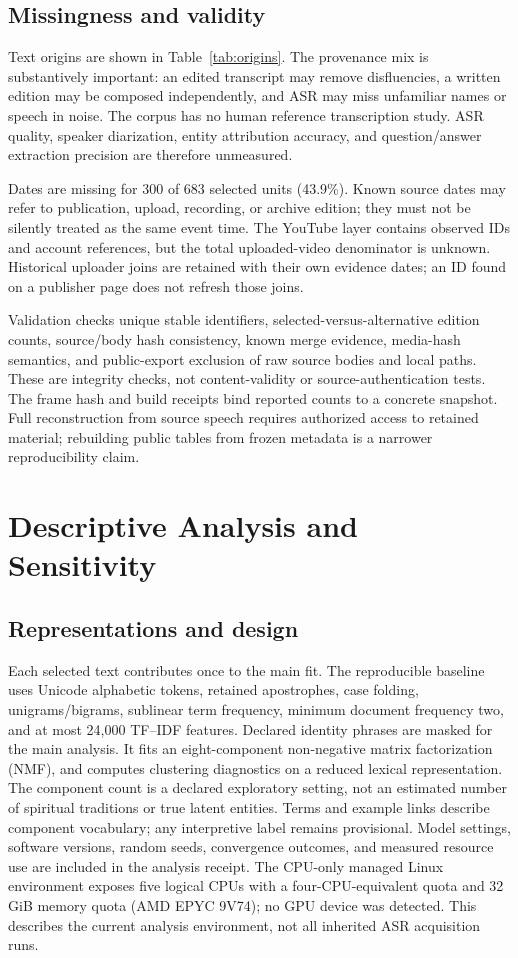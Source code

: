 

\subsection{Missingness and validity}
Text origins are shown in Table~\ref{tab:origins}. The provenance mix is substantively important: an edited transcript may remove disfluencies, a written edition may be composed independently, and ASR may miss unfamiliar names or speech in noise. The corpus has no human reference transcription study. ASR quality, speaker diarization, entity attribution accuracy, and question/answer extraction precision are therefore unmeasured.

Dates are missing for 300 of 683 selected units (43.9\%). Known source dates may refer to publication, upload, recording, or archive edition; they must not be silently treated as the same event time. The YouTube layer contains \VideoCount{} observed IDs and \AccountCount{} account references, but the total uploaded-video denominator is unknown. Historical uploader joins are retained with their own evidence dates; an ID found on a publisher page does not refresh those joins.

Validation checks unique stable identifiers, selected-versus-alternative edition counts, source/body hash consistency, known merge evidence, media-hash semantics, and public-export exclusion of raw source bodies and local paths. These are integrity checks, not content-validity or source-authentication tests. The frame hash and build receipts bind reported counts to a concrete snapshot. Full reconstruction from source speech requires authorized access to retained material; rebuilding public tables from frozen metadata is a narrower reproducibility claim.

\section{Descriptive Analysis and Sensitivity}
\subsection{Representations and design}
Each selected text contributes once to the main fit. The reproducible baseline uses Unicode alphabetic tokens, retained apostrophes, case folding, unigrams/bigrams, sublinear term frequency, minimum document frequency two, and at most 24,000 TF--IDF features. Declared identity phrases are masked for the main analysis. It fits an eight-component non-negative matrix factorization (NMF), and computes clustering diagnostics on a reduced lexical representation. The component count is a declared exploratory setting, not an estimated number of spiritual traditions or true latent entities. Terms and example links describe component vocabulary; any interpretive label remains provisional. Model settings, software versions, random seeds, convergence outcomes, and measured resource use are included in the analysis receipt. The CPU-only managed Linux environment exposes five logical CPUs with a four-CPU-equivalent quota and 32 GiB memory quota (AMD EPYC 9V74); no GPU device was detected. This describes the current analysis environment, not all inherited ASR acquisition runs.

